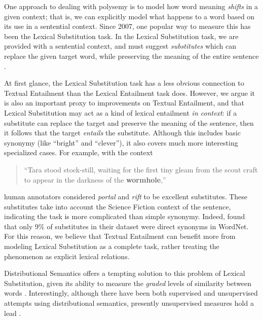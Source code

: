 One approach to dealing with polysemy is to model how word
meaning {\em shifts} in a given context; that is, we can explicitly model what
happens to a word based on its use in a sentential context. Since 2007, one
popular way to measure this has been the Lexical Substitution task.  In the
Lexical Substitution task, we are provided with a sentential context,
and must suggest {\em substitutes} which can replace the given target word,
while preserving the meaning of the entire sentence
\cite{mccarthy:2007:semeval,biemann:2012:lrec,kremer:2014:eacl}.

At first glance, the Lexical Substitution task has a less obvious connection to
Textual Entailment than the Lexical Entailment task does. However, we argue
it is also an important proxy to improvements on Textual Entailment, and that
Lexical Substitution may act as a kind of lexical entailment {\em
in context}: if a substitute can replace the target and preserve the meaning of
the sentence, then it follows that the target {\em entails} the substitute.
Although this includes basic synonymy (like ``bright'' and ``clever''), it
also covers much more interesting specialized cases. For example, with the
context
\begin{quote}
  ``Tara stood stock-still, waiting for the first tiny gleam from the
  scout craft to appear in the darkness of the {\bf wormhole},''
\end{quote}
human annotators considered {\em portal} and {\em rift} to be excellent
substitutes. These substitutes take into account the Science Fiction context of the
sentence, indicating the task is more complicated than simple synonymy. Indeed,
 found that only 9\% of substitutes in their dataset were
direct synonyms in WordNet.  For this reason, we believe that Textual
Entailment can benefit more from modeling Lexical Substitution as a complete
task, rather treating the phenomenon as explicit lexical relations.

Distributional Semantics offers a tempting solution to this problem of Lexical
Substitution, given its ability to measure the {\em graded} levels of similarity
between words \cite{erk:2008:emnlp}. Interestingly, although there have been
both supervised \cite{biemann:2012:lrec,szarvas:2013:naacl} and unsupervised
attempts
\cite{erk:2008:emnlp,dinu:2010:emnlp,thater:2010:acl,vandecruys:2011:emnlp,kremer:2014:eacl,melamud:2015:naacl,melamud:2015:vsm,kawakami:2016:iclr,roller:2016:naacl}
using distributional semantics, presently unsupervised measures hold
a lead \cite{melamud:2015:naacl,melamud:2016:conll}.


